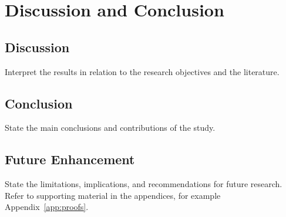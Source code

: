 \chapter{Discussion and Conclusion}

\section{Discussion}

Interpret the results in relation to the research objectives and the
literature.

\section{Conclusion}

State the main conclusions and contributions of the study.

\section{Future Enhancement}

State the limitations, implications, and recommendations for future research.
Refer to supporting material in the appendices, for example
Appendix~\ref{app:proofs}.
